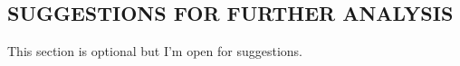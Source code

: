 \documentclass{article}
\begin{document}
\begin{multicols}{2}
\section*{SUGGESTIONS FOR FURTHER ANALYSIS}

This section is optional but I'm open for suggestions. %






\end{multicols}
\end{document}
